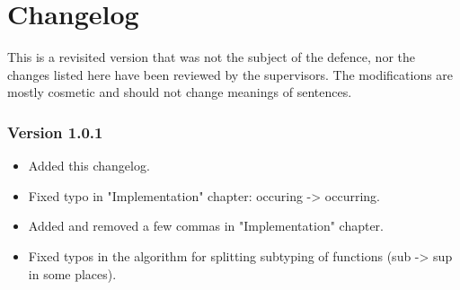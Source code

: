 \chapter*{Changelog}

This is a revisited version that was not the subject of the defence, nor the
changes listed here have been reviewed by the supervisors. The modifications
are mostly cosmetic and should not change meanings of sentences.

\subsection*{Version 1.0.1}

\begin{itemize}
\item Added this changelog.
\item Fixed typo in "Implementation" chapter: occuring -> occurring.
\item Added and removed a few commas in "Implementation" chapter. 
\item Fixed typos in the algorithm for splitting subtyping of functions
  (sub -> sup in some places).
\end{itemize}